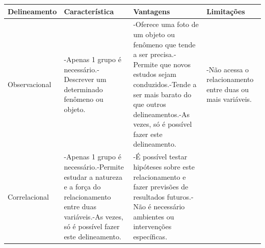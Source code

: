 \documentclass[
]{book}
\begin{document}
\begin{longtable}[]{@{}llll@{}}
\toprule
\begin{minipage}[b]{0.22\columnwidth}\raggedright
Delineamento\strut
\end{minipage} & \begin{minipage}[b]{0.22\columnwidth}\raggedright
Característica\strut
\end{minipage} & \begin{minipage}[b]{0.22\columnwidth}\raggedright
Vantagens\strut
\end{minipage} & \begin{minipage}[b]{0.22\columnwidth}\raggedright
Limitações\strut
\end{minipage}\tabularnewline
\midrule
\endhead
\begin{minipage}[t]{0.22\columnwidth}\raggedright
Observacional\strut
\end{minipage} & \begin{minipage}[t]{0.22\columnwidth}\raggedright
-Apenas 1 grupo é necessário.-Descrever um determinado fenômeno ou
objeto.\strut
\end{minipage} & \begin{minipage}[t]{0.22\columnwidth}\raggedright
-Oferece uma foto de um objeto ou fenômeno que tende a ser
precisa.-Permite que novos estudos sejam conduzidos.-Tende a ser mais
barato do que outros delineamentos.-As vezes, só é possível fazer este
delineamento.\strut
\end{minipage} & \begin{minipage}[t]{0.22\columnwidth}\raggedright
-Não acessa o relacionamento entre duas ou mais variáveis.\strut
\end{minipage}\tabularnewline
\begin{minipage}[t]{0.22\columnwidth}\raggedright
Correlacional\strut
\end{minipage} & \begin{minipage}[t]{0.22\columnwidth}\raggedright
-Apenas 1 grupo é necessário.-Permite estudar a natureza e a força do
relacionamento entre duas variáveis.-As vezes, só é possível fazer este
delineamento.\strut
\end{minipage} & \begin{minipage}[t]{0.22\columnwidth}\raggedright
-É possível testar hipóteses sobre este relacionamento e fazer previsões
de resultados futuros.-Não é necessário ambientes ou intervenções
específicas.\strut
\end{minipage} & \begin{minipage}[t]{0.22\columnwidth}\raggedright

\end{minipage}
\end{longtable}
\end{document}
